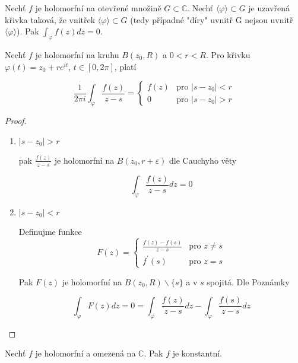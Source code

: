 \begin{vetabd}[Cauchy]
Nechť $f$ je holomorfní na otevřené množině $G \subset \mathbb{C}$. Nechť $\langle \varphi \rangle \subset G$ je uzavřená křivka taková, že vnitřek $\langle \varphi \rangle \subset G$ (tedy případné "díry" uvnitř G nejsou uvnitř $\langle \varphi \rangle$). Pak $\int_\varphi f(z)dz=0$.
\end{vetabd}

\begin{vetal}
\label{Cauchyův vzorec}
Nechť $f$ je holomorfní na kruhu $B(z_0, R)$ a $0<r<R$. Pro křivku $\varphi(t) = z_0 + r e^{it}$, $t \in [0,2\pi]$, platí

\begin{equation}
\frac{1}{2 \pi i} \int_\varphi \frac{f(z)}{z-s}  = \left\{ \begin{array}{ll}
 f(z) & \textrm{pro $|s-z_0| < r$} \nonumber\\
 0 & \textrm{pro $| s-z_0 | > r$}
  \end{array} \right.
\end{equation}
\end{vetal}

\begin{proof}
\begin{enumerate}
\item $|s-z_0| > r$

pak $\frac{f(z)}{z-s}$ je holomorfní na $B(z_0, r + \varepsilon)$ dle Cauchyho věty

$$\int_\varphi \frac{f(z)}{z-s} dz = 0$$

\item $|s-z_0| < r$

Definujme funkce 
\begin{equation}
F(z)  = \left\{ \begin{array}{ll}
 \frac{f(z)-f(s)}{z-s} & \textrm{pro $z \neq s$} \nonumber\\
 f^\prime(s) & \textrm{pro $z=s$}
  \end{array} \right.
\end{equation}

Pak $F(z)$ je holomorfní na $B(z_0, R) \backslash \{ s \}$ a v $s$ spojitá. Dle Poznámky

$$\int_\varphi F(z) dz = 0 = \int_\varphi \frac{f(z)}{z-s} dz - \int_\varphi \frac{f(s)}{z-s} dz$$
\end{enumerate}
\end{proof}


\begin{vetat}[Liouville]
\label{Liouville}
Nechť $f$ je holomorfní a omezená na $\mathbb{C}$. Pak $f$ je konstantní.
\end{vetat}

